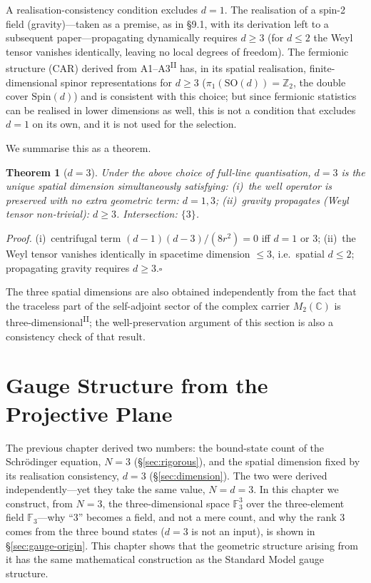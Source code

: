 \documentclass[12pt,a4paper]{article}
\newtheorem{theorem}{Theorem}
\newcommand{\PII}{\textsuperscript{\textup{II}}}
\begin{document}
A realisation-consistency condition excludes $d = 1$.
The realisation of a spin-2 field (gravity)---taken as a
premise, as in \S9.1, with its derivation left to a subsequent
paper---propagating dynamically requires $d \geq 3$ (for $d \leq 2$
the Weyl tensor vanishes identically, leaving no local degrees of
freedom).
The fermionic structure (CAR) derived from A1--A3\PII{} has, in its
spatial realisation, finite-dimensional spinor representations for
$d \geq 3$ ($\pi_1(\mathrm{SO}(d)) = \mathbb{Z}_2$, the double cover
$\mathrm{Spin}(d)$) and is consistent with this choice; but since
fermionic statistics can be realised in lower dimensions as well,
this is not a condition that excludes $d = 1$ on its own, and it is
not used for the selection.

We summarise this as a theorem.

\begin{theorem}[$d = 3$]\label{thm:d3}
Under the above choice of full-line quantisation, $d = 3$ is the unique spatial dimension simultaneously satisfying:
\emph{(i)}~the well operator is preserved with no extra geometric term: $d = 1, 3$;
\emph{(ii)}~gravity propagates (Weyl tensor non-trivial): $d \geq 3$.
Intersection: $\{3\}$.
\end{theorem}

\noindent\textit{Proof.}\;
(i)~centrifugal term $(d{-}1)(d{-}3)/(8r^2) = 0$ iff $d = 1$ or $3$;
(ii)~the Weyl tensor vanishes identically in spacetime dimension
$\leq 3$, i.e.\ spatial $d \leq 2$; propagating gravity requires $d \geq 3$.\hfill$\square$

The three spatial dimensions are also obtained independently from
the fact that the traceless part of the self-adjoint sector of the
complex carrier $M_2(\mathbb{C})$ is three-dimensional\PII{}; the
well-preservation argument of this section is also a consistency
check of that result.



\section{Gauge Structure from the Projective Plane}\label{sec:gauge}

The previous chapter derived two numbers: the bound-state count of the Schr\"odinger equation, $N = 3$ (\S\ref{sec:rigorous}), and the spatial dimension fixed by its realisation consistency, $d = 3$ (\S\ref{sec:dimension}). The two were derived independently---yet they take the same value, $N = d = 3$. In this chapter we construct, from $N = 3$, the three-dimensional space $\mathbb{F}_3^3$ over the three-element field $\mathbb{F}_3$---why ``3'' becomes a field, and not a mere count, and why the rank 3 comes from the three bound states ($d = 3$ is not an input), is shown in \S\ref{sec:gauge-origin}. This chapter shows that the geometric structure arising from it has the same mathematical construction as the Standard Model gauge structure.
\end{document}
